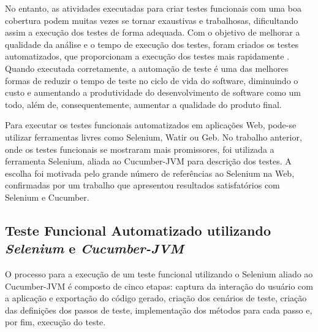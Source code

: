 \documentclass[12pt]{article}
\begin{document}
No entanto, as atividades executadas para criar testes funcionais com uma boa cobertura podem muitas vezes se tornar exaustivas e trabalhosas, dificultando assim a execução dos testes de forma adequada. Com o objetivo de melhorar a qualidade da análise e o tempo de execução dos testes, foram criados os testes automatizados, que proporcionam a execução dos testes mais rapidamente \cite{fantinato2005autotest}. Quando executada corretamente, a automação de teste é uma das melhores formas de reduzir o tempo de teste no ciclo de vida do software, diminuindo o custo e aumentando a produtividade do desenvolvimento de software como um todo, além de, consequentemente, aumentar a qualidade do produto final.

Para executar os testes funcionais automatizados em aplicações Web, pode-se utilizar ferramentas livres como Selenium\cite{selenium}, Watir\cite{watir} ou Geb\cite{geb}. No trabalho anterior\cite{sbqs2015}, onde os testes funcionais se mostraram mais promissores, foi utilizada a ferramenta Selenium, aliada ao Cucumber-JVM\cite{cucumber} para descrição dos testes. A escolha foi motivada pelo grande número de referências ao Selenium na Web, confirmadas por um trabalho que apresentou resultados satisfatórios com Selenium e Cucumber\cite{pannutest,sbqs2013}.



\subsection{Teste Funcional Automatizado utilizando \emph{Selenium} e \emph{Cucumber-JVM}}
O processo para a execução de um teste funcional utilizando o Selenium aliado ao Cucumber-JVM é composto de cinco etapas: captura da interação do usuário com a aplicação e exportação do código gerado, criação dos cenários de teste, criação das definições dos passos de teste, implementação dos métodos para cada passo e, por fim, execução do teste.
\end{document}
